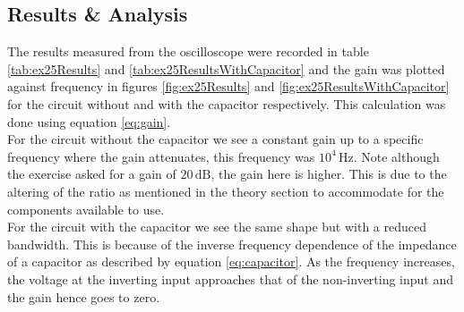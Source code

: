 \documentclass[%
reprint,
amsmath,amssymb,
aps,
floatfix
]{revtex4-2}
\begin{document}
		\subsection{Results \& Analysis}
		The results measured from the oscilloscope were recorded in table \ref{tab:ex25Results} and \ref{tab:ex25ResultsWithCapacitor} and the gain was plotted against frequency in figures \ref{fig:ex25Results} and \ref{fig:ex25ResultsWithCapacitor} for the circuit without and with the capacitor respectively. This calculation was done using equation \ref{eq:gain}.\\
		
		For the circuit without the capacitor we see a constant gain up to a specific frequency where the gain attenuates, this frequency was $10^4\,\text{Hz}$. Note although the exercise asked for a gain of $20\,\text{dB}$, the gain here is higher. This is due to the altering of the ratio as mentioned in the theory section to accommodate for the components available to use.\\
		
		For the circuit with the capacitor we see the same shape but with a reduced bandwidth. This is because of the inverse frequency dependence of the impedance of a capacitor as described by equation \ref{eq:capacitor}. As the frequency increases, the voltage at the inverting input approaches that of the non-inverting input and the gain hence goes to zero.
		
		\begin{table}[]
			\caption{The data measured using the oscilloscope for exercise 25.}
			\label{tab:ex25Results}
		\end{table}
	
\end{document}
